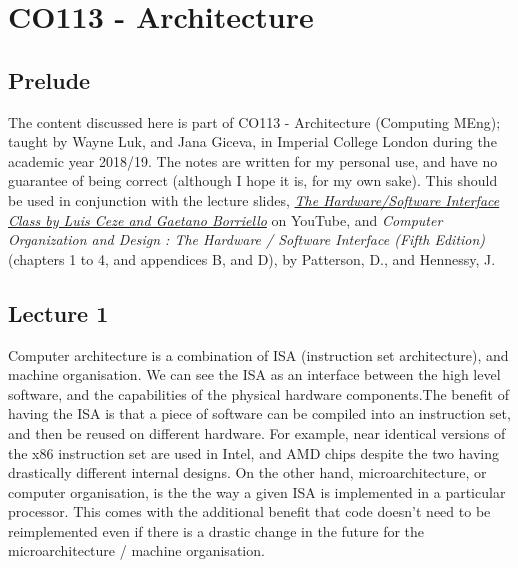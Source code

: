 \documentclass[a4paper, 12pt]{article}
\begin{document}
    \section*{CO113 - Architecture}
        \subsection*{Prelude}
            The content discussed here is part of CO113 - Architecture (Computing MEng); taught by Wayne Luk, and Jana Giceva, in Imperial College London during the academic year 2018/19. The notes are written for my personal use, and have no guarantee of being correct (although I hope it is, for my own sake). This should be used in conjunction with the lecture slides, \href{https://www.youtube.com/playlist?list=PL0oekSefhQVJdk0hSRu6sZ2teWM740NtL}{\textit{The Hardware/Software Interface Class by Luis Ceze and Gaetano Borriello}} on YouTube, and \textit{Computer Organization and Design : The Hardware / Software Interface (Fifth Edition)} (chapters 1 to 4, and appendices B, and D), by Patterson, D., and Hennessy, J.
        \subsection*{Lecture 1}
            Computer architecture is a combination of ISA (instruction set architecture), and machine organisation. We can see the ISA as an interface between the high level software, and the capabilities of the physical hardware components.The benefit of having the ISA is that a piece of software can be compiled into an instruction set, and then be reused on different hardware. For example, near identical versions of the x86 instruction set are used in Intel, and AMD chips despite the two having drastically different internal designs. On the other hand, microarchitecture, or computer organisation, is the the way a given ISA is implemented in a particular processor. This comes with the additional benefit that code doesn't need to be reimplemented even if there is a drastic change in the future for the microarchitecture / machine organisation.
            \medskip
\end{document}
